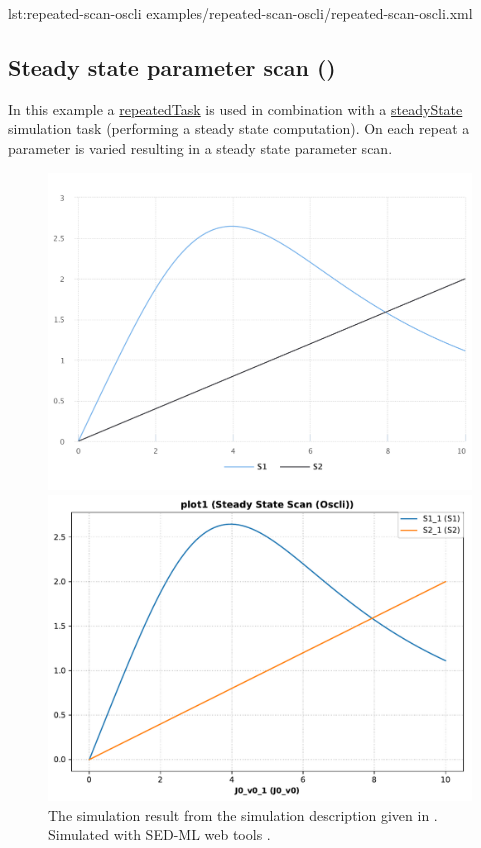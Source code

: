 {lst:repeated-scan-oscli}
{examples/repeated-scan-oscli/repeated-scan-oscli.xml}

\subsection{Steady state parameter scan ()}
In this example a \hyperref[class:repeatedTask]{repeatedTask} is used in combination with a \hyperref[class:steadyState]{steadyState} simulation task (performing a steady state computation). On each repeat a parameter is varied resulting in a steady state parameter scan.

\begin{figure}[ht]
    \centering
    \begin{minipage}{0.47\textwidth}
        \centering
        \includegraphics[width=1.0\textwidth]{examples/repeated-steady-scan-oscli/results/sedml_webtools/plot1}
        \caption{The simulation result from the simulation description given in . Simulated with SED-ML web tools \citep{bergmann2017sed}.}
    \end{minipage}\hfill
    \begin{minipage}{0.47\textwidth}
        \centering
        \includegraphics[width=1.0\textwidth]{examples/repeated-steady-scan-oscli/results/tellurium/plot1}

\end{minipage}
\end{figure}
